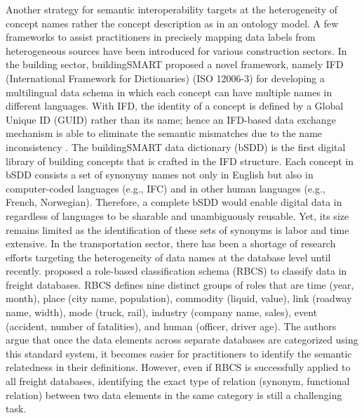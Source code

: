 \documentclass[Journal, BackFigs,NoLists, DoubleSpace]{ascelike}%
\begin{document}
\par
%
Another strategy for semantic interoperability targets at the heterogeneity of concept names rather the concept description as in an ontology model. A few frameworks to assist practitioners in precisely mapping data labels from heterogeneous sources have been introduced for various construction sectors. In the building sector, buildingSMART proposed a novel framework, namely IFD (International Framework for Dictionaries) (ISO 12006-3) for developing a multilingual data schema in which each concept can have multiple names in different languages. With IFD, the identity of a concept is defined by a Global Unique ID (GUID) rather than its name; hence an IFD-based data exchange mechanism is able to eliminate the semantic mismatches due to the name inconsistency \cite{IFDgroup08,hezik08}. The buildingSMART data dictionary (bSDD) \cite{buildingsmartData} is the first digital library of building concepts that is crafted in the IFD structure. Each concept in bSDD consists a set of synonymy names not only in English but also in computer-coded languages (e.g., IFC) and in other human languages (e.g., French, Norwegian). Therefore, a complete bSDD would enable digital data in regardless of languages to be sharable and unambiguously reusable. Yet, its size remains limited as the identification of these sets of synonyms is labor and time extensive. In the transportation sector, there has been a shortage of research efforts targeting the heterogeneity of data names at the database level until recently.   proposed a role-based classification schema (RBCS) to classify data in freight databases. RBCS defines nine distinct groups of roles that are time (year, month), place (city name, population), commodity (liquid, value), link (roadway name, width), mode (truck, rail), industry (company name, sales), event (accident, number of fatalities), and human (officer, driver age). The authors argue that once the data elements across separate databases are categorized using this standard system, it becomes easier for practitioners to identify the semantic relatedness in their definitions. However, even if RBCS is successfully applied to all freight databases, identifying the exact type of relation (synonym, functional relation) between two data elements in the same category is still a challenging task.
\par
%
\end{document}
